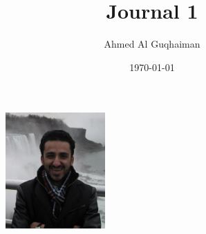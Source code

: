 \documentclass{article}
\begin{document}
\title{\textbf{Journal 1}}
\author{Ahmed Al Guqhaiman}
\date{\today}
\maketitle

\begin{figure}
\includegraphics[width=1.5in]{Niagara_Falls.jpg}
\end{figure} 
\end{document}
